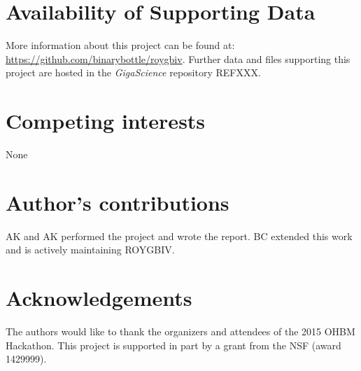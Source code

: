 \documentclass[twocolumn]{bmcart}%
\begin{document}
\begin{backmatter}

\section*{Availability of Supporting Data}
More information about this project can be found at: \url{https://github.com/binarybottle/roygbiv}. Further data and files supporting this project are hosted in the \emph{GigaScience} repository REFXXX.

\section*{Competing interests}
None

\section*{Author's contributions}
AK and AK performed the project and wrote the report. BC extended this
work and is actively maintaining ROYGBIV.

\section*{Acknowledgements}
The authors would like to thank the organizers and attendees of the 2015
OHBM Hackathon. This project is supported in part by a grant from the
NSF (award 1429999).

  
  


\end{backmatter}
\end{document}
